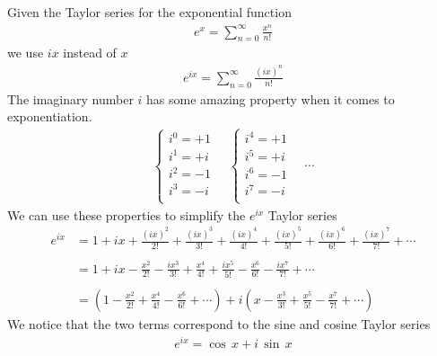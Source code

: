 \documentclass{article}
\begin{document}
Given the Taylor series for the exponential function
\begin{align*}
	e^x=\sum_{n=0}^{\infty}\frac{x^n}{n!}
\end{align*}
we use \(ix\) instead of \(x\)
\begin{align*}
	e^{ix}=\sum_{n=0}^{\infty}\frac{{(ix)}^n}{n!}
\end{align*}
The imaginary number \(i\) has some amazing property when it comes to exponentiation.
\begin{align*}
	\begin{cases}
		i^0=+1\\
		i^1=+i\\
		i^2=-1\\
		i^3=-i\\
	\end{cases}
	\quad
	\begin{cases}
		i^4=+1\\
		i^5=+i\\
		i^6=-1\\
		i^7=-i\\
	\end{cases}
	\quad
	\cdots
\end{align*}
We can use these properties to simplify the \(e^{ix}\) Taylor series
\begin{align*}
	e^{ix}
	&   =1
		+ix
		+\frac{{(ix)}^2}{2!}
		+\frac{{(ix)}^3}{3!}
		+\frac{{(ix)}^4}{4!}
		+\frac{{(ix)}^5}{5!}
		+\frac{{(ix)}^6}{6!}
		+\frac{{(ix)}^7}{7!}
		+\cdots
	\\
	\\
	&   =1
		+ix
		-\frac{x^2}{2!}
		-\frac{ix^3}{3!}
		+\frac{x^4}{4!}
		+\frac{ix^5}{5!}
		-\frac{x^6}{6!}
		-\frac{ix^7}{7!}
		+\cdots
	\\
	\\
	&=
	\left(
		1
		-\frac{x^2}{2!}
		+\frac{x^4}{4!}
		-\frac{x^6}{6!}
		+\cdots
	\right)
	+i
	\left(
		x
		-\frac{x^3}{3!}
		+\frac{x^5}{5!}
		-\frac{x^7}{7!}
		+\cdots
	\right)
\end{align*}
We notice that the two terms correspond to the sine and cosine Taylor series
\begin{align*}
	e^{ix}=\cos\,x+i\,\sin\,x
\end{align*}
\end{document}
